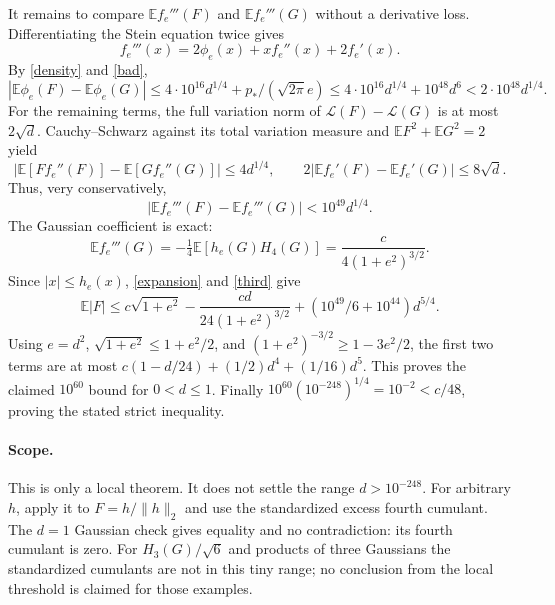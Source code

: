 \documentclass[11pt]{article}
\newcommand{\E}{\mathbb E}\newcommand{\Pp}{\mathbb P}\newcommand{\Ga}{\Gamma}
\begin{document}
It remains to compare $\E f_e'''(F)$ and $\E f_e'''(G)$ without a derivative loss.
Differentiating the Stein equation twice gives
\[
 f_e'''(x)=2\phi_e(x)+x f_e''(x)+2f_e'(x).
\]
By \eqref{density} and \eqref{bad},
\[
 |\E\phi_e(F)-\E\phi_e(G)|
 \le4\cdot10^{16}d^{1/4}+p_*/(\sqrt{2\pi}e)
 \le4\cdot10^{16}d^{1/4}+10^{48}d^6
 <2\cdot10^{48}d^{1/4}.
\]
For the remaining terms, the full variation norm of $\mathcal L(F)-\mathcal L(G)$
is at most $2\sqrt d$. Cauchy--Schwarz against its total variation measure and
$\E F^2+\E G^2=2$ yield
\[
 |\E[Ff_e''(F)]-\E[Gf_e''(G)]|\le4d^{1/4},\qquad
 2|\E f_e'(F)-\E f_e'(G)|\le8\sqrt d.
\]
Thus, very conservatively,
\begin{equation}\label{third}
 |\E f_e'''(F)-\E f_e'''(G)|<10^{49}d^{1/4}.
\end{equation}
The Gaussian coefficient is exact:
\[
 \E f_e'''(G)=-\tfrac14\E[h_e(G)H_4(G)]
 =\frac{c}{4(1+e^2)^{3/2}}.
\]
Since $|x|\le h_e(x)$, \eqref{expansion} and \eqref{third} give
\[
 \E|F|\le c\sqrt{1+e^2}
 -\frac{cd}{24(1+e^2)^{3/2}}
 +\left(10^{49}/6+10^{44}\right)d^{5/4}.
\]
Using $e=d^2$, $\sqrt{1+e^2}\le1+e^2/2$, and
$(1+e^2)^{-3/2}\ge1-3e^2/2$, the first two terms are at most
$c(1-d/24)+(1/2)d^4+(1/16)d^5$.
This proves the claimed $10^{60}$ bound for $0<d\le1$.
Finally $10^{60}(10^{-248})^{1/4}=10^{-2}<c/48$, proving the stated strict inequality.

\paragraph{Scope.}
This is only a local theorem. It does not settle the range $d>10^{-248}$.
For arbitrary $h$, apply it to $F=h/\|h\|_2$ and use the standardized excess fourth cumulant.
The $d=1$ Gaussian check gives equality and no contradiction: its fourth cumulant is zero.
For $H_3(G)/\sqrt6$ and products of three Gaussians the standardized cumulants are not in this tiny range;
no conclusion from the local threshold is claimed for those examples.
\end{document}
